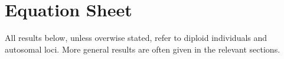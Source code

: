 





%
\section*{Equation Sheet}
All results below, unless overwise stated, refer to diploid individuals and
autosomal loci. More general results are often given in the relevant sections.
\begin{table*}[!htbp]
{\small
}
\end{table*}  %




%
